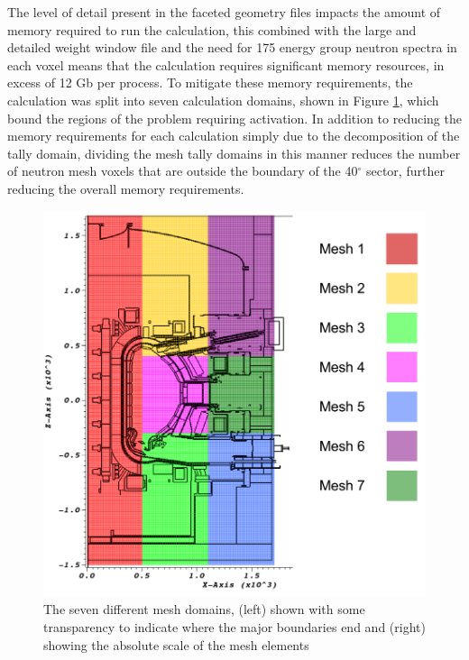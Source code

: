 \documentclass[12pt]{article}
\begin{document}
The level of detail present in the faceted geometry files impacts the amount of
memory required to run the calculation, this combined with the large and
detailed weight window file and the need for 175 energy group neutron spectra
in each voxel means that the calculation requires significant memory resources,
in excess of 12 Gb per process.  %
To mitigate these memory requirements, the calculation was split into seven 
calculation domains, shown in Figure
\ref{fig:mesh_domains}, which bound the regions of the problem requiring
activation. In addition to reducing the memory requirements for each calculation
simply due to the decomposition of the tally domain, dividing the mesh tally 
domains in this manner reduces the number of neutron mesh voxels that are 
outside the boundary of the 40$^{\circ}$ sector, further reducing the overall memory
requirements.

\begin{figure}[ht!]
  \centering
  \includegraphics[scale=0.4]{../plots/transport/job_splits.png}
  \caption{The seven different mesh domains, (left) shown with some transparency
           to indicate where the major boundaries end and (right) showing the
           absolute scale of the mesh elements}
  \label{fig:mesh_domains}
\end{figure}
\end{document}
